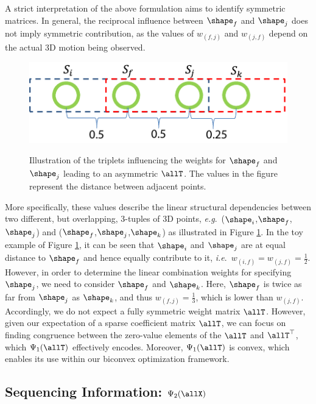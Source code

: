 A strict interpretation of the above formulation aims to identify symmetric matrices.
In general, the reciprocal influence between $\shape_{f}$ and $\shape_{j}$ does not imply symmetric contribution,
as the values of $w_{(f,j)}$ and  $w_{(j,f)}$ depend on the actual 3D motion being observed.
\begin{figure}
  \centering
  \includegraphics[width=0.85\columnwidth]{chapter5/resource/TripletFig.pdf}\\
  \caption[Illustration of the relationship between shape weights.]{Illustration of the triplets influencing the weights for $\shape_f$ and $\shape_j$ leading to an asymmetric $\allT$. The values in the figure represent the distance between adjacent points.}
  \label{fig:Triplet}
\end{figure}
More specifically, these values describe the linear structural  dependencies between two different, but overlapping, 3-tuples of 3D points, \emph{e.g}.~($\shape_{i}$,$\shape_{f}$,$\shape_{j}$) and ($\shape_{f}$,$\shape_{j}$,$\shape_{k}$) as illustrated in Figure \ref{fig:Triplet}. In the toy example of Figure \ref{fig:Triplet}, it can be seen that $\shape_{i}$ and $\shape_{j}$ are at equal distance to $\shape_{f}$ and hence equally contribute to it, \emph{i.e}.~$w_{(i,f)} = w_{(j,f)}=\frac{1}{2}$. However, in order to determine the linear combination weights for specifying $\shape_j$, we need to consider $\shape_f$ and $\shape_k$. Here, $\shape_f$ is twice as far from $\shape_j$ as $\shape_k$, and thus $w_{(f,j)}=\frac{1}{3}$, which is lower than $w_{(j,f)}$.
Accordingly, we do not expect a fully symmetric weight matrix   $\allT$. However,  given our expectation of a sparse coefficient matrix $\allT$, we can focus on finding congruence between the zero-value elements of the $\allT$ and $\allT^\top$, which $\Psi_1(\allT)$ effectively encodes.
Moreover, $\Psi_1(\allT)$  is convex, which enables its use within our biconvex optimization framework.

\subsection{Sequencing Information: \texorpdfstring{$\Psi_2(\allX)$}{psiallX} }

